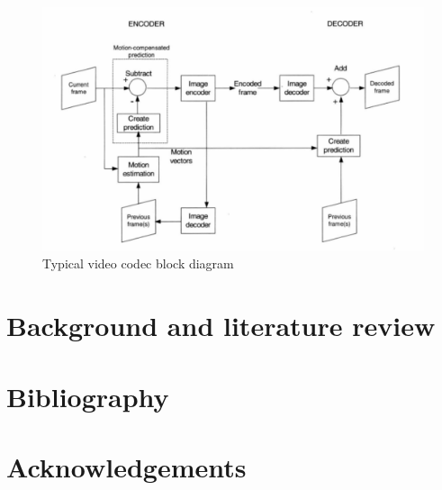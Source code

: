 \documentclass[a4paper,11pt,oneside]{article}
\begin{document}
\begin{figure}[h]
  \centering
  \includegraphics[width=\textwidth]{../figures/f1_codec_block_diagram.pdf}
  \caption{Typical video codec block diagram\cite[p.~44]{richardson2002video}}
  \label{figure:codec_block_diagram}
\end{figure}



\newpage
\section{Background and literature review}












\newpage
\section*{Bibliography}
\printbibliography


\newpage
\section*{Acknowledgements}
\end{document}
